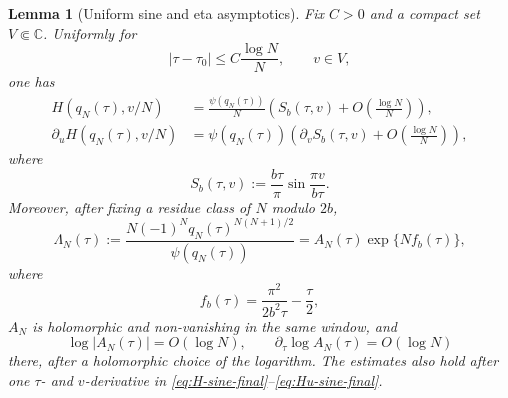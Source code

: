 \documentclass[11pt,a4paper,reqno]{amsart}
\newtheorem{lemma}[theorem]{Lemma}
\theoremstyle{remark}
\newcommand{\C}{\mathbb C}
\begin{document}
\begin{lemma}[Uniform sine and eta asymptotics]\label{lem:cusp-asymptotics-final}
Fix $C>0$ and a compact set $V\Subset\C$.  Uniformly for
\[
        |\tau-\tau_0|\le C\frac{\log N}{N},
        \qquad v\in V,
\]
one has
\begin{align}
        H(q_N(\tau),v/N)
        &=\frac{\psi(q_N(\tau))}{N}
          \left(S_b(\tau,v)+O\left(\frac{\log N}{N}\right)\right),\label{eq:H-sine-final}\\
        \partial_uH(q_N(\tau),v/N)
        &=\psi(q_N(\tau))
          \left(\partial_vS_b(\tau,v)+O\left(\frac{\log N}{N}\right)\right),\label{eq:Hu-sine-final}
\end{align}
where
\begin{equation}\label{eq:Sb-final-def}
        S_b(\tau,v):=\frac{b\tau}{\pi}\sin\frac{\pi v}{b\tau}.
\end{equation}
Moreover, after fixing a residue class of $N$ modulo $2b$,
\begin{equation}\label{eq:Lambda-final-asym}
        \Lambda_N(\tau):=\frac{N(-1)^Nq_N(\tau)^{N(N+1)/2}}{\psi(q_N(\tau))}
        =A_N(\tau)\exp\{Nf_b(\tau)\},
\end{equation}
where
\begin{equation}\label{eq:fb-def}
        f_b(\tau)=\frac{\pi^2}{2b^2\tau}-\frac{\tau}{2},
\end{equation}
$A_N$ is holomorphic and non-vanishing in the same window, and
\begin{equation}\label{eq:AN-bound}
        \log |A_N(\tau)|=O(\log N),
        \qquad
        \partial_\tau\log A_N(\tau)=O(\log N)
\end{equation}
there, after a holomorphic choice of the logarithm.  The estimates also hold after one $\tau$- and $v$-derivative in \eqref{eq:H-sine-final}--\eqref{eq:Hu-sine-final}.
\end{lemma}
\end{document}
